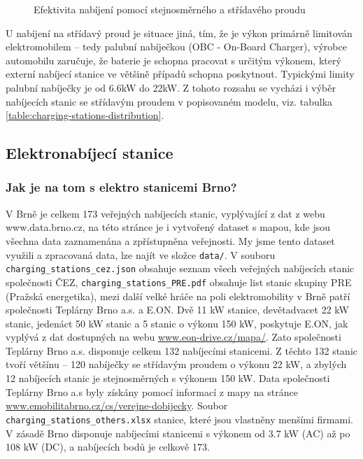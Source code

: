 \documentclass[a4paper,11pt]{article}
\begin{document}
\begin{figure}[H]
    \centering
    \caption{Efektivita nabíjení pomocí stejnosměrného a střídavého proudu \cite{rozdil_mezi_ac_dc_nabijenim_graf}}
    \label{figure:ac-dc-charging-efficency}
\end{figure}

U nabíjení na střídavý proud je situace jiná, tím, že je výkon primárně limitován elektromobilem -- tedy palubní nabíječkou 
(OBC - On-Board Charger), výrobce automobilu zaručuje, že baterie je schopna pracovat s určitým výkonem, který externí
nabíjecí stanice ve většině případů schopna poskytnout. Typickými limity palubní nabíječky je od 6.6kW do 22kW. \cite{we_power_your_car_obc}
Z tohoto rozsahu se vycházi i výběr nabíjecích stanic se střídavým proudem v popisovaném modelu, viz. tabulka \ref{table:charging-stations-distribution}.

\subsection{Elektronabíjecí stanice}

\subsubsection{Jak je na tom s elektro stanicemi Brno?}
\label{sec:stanice}
V Brně je celkem 173 veřejných nabíjecích stanic, vyplývající z dat z webu www.data.brno.cz\cite{data_brno},
na této stránce je i vytvořený dataset s mapou, kde jsou všechna data zaznamenána a zpřístupněna veřejnosti.
My jsme tento dataset využili a zpracovaná data, lze najít ve složce \texttt{data/}. V souboru \texttt{charging\_stations\_cez.json}
obsahuje seznam všech veřejných nabíjecích stanic společnosti ČEZ, \texttt{charging\_stations\_PRE.pdf} obsahuje
list stanic skupiny PRE (Pražská energetika), mezi další velké hráče na poli elektromobility v Brně patří společnosti
Teplárny Brno a.s. a E.ON. Dvě 11 kW stanice, devětadvacet 22 kW stanic, jedenáct 50 kW stanic a 5 stanic o výkonu 150 kW,
poskytuje E.ON, jak vyplývá z dat dostupných na webu \href{https://www.eon-drive.cz/mapa/}{www.eon-drive.cz/mapa/}.
Zato společnosti Teplárny Brno a.s. disponuje celkem 132 nabíjecími stanicemi. Z těchto 132 stanic tvoří většínu -- 120
nabíječky se střídavým proudem o výkonu 22 kW, a zbylých 12 nabíjecích stanic je stejnosměrných s výkonem 150 kW.
Data společnosti Teplárny Brno a.s byly získány pomocí informací z mapy na stránce
\href{https://www.emobilitabrno.cz/cs/verejne-dobijecky}{www.emobilitabrno.cz/cs/verejne-dobijecky}.
Soubor \texttt{charging\_stations\_others.xlsx} stanice, které jsou vlastněny menšími firmami.
V zásadě Brno disponuje nabíjecími stanicemi s výkonem od 3.7 kW (AC) až po 108 kW (DC), a nabíjecích bodů je 
celkově 173. \cite{eon_data, emobilita_data}
\end{document}
